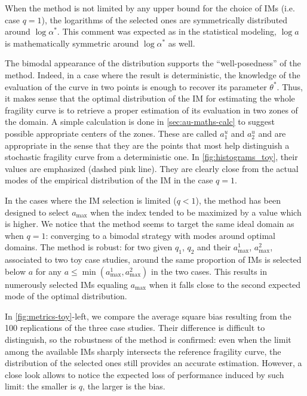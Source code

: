     
    When the method is not limited by any upper bound for the choice of IMs (i.e. case $q=1$), 
    the logarithms of the selected ones are symmetrically distributed around $\log\alpha^\ast$. This comment was expected as in the statistical modeling, $\log a$ is mathematically symmetric around $\log\alpha^\ast$ as well.
    
    The bimodal appearance of the distribution supports the ``well-posedness'' of the method. Indeed, in a case where the result is deterministic, the knowledge of the evaluation of the curve in two points is enough to recover its parameter $\theta^\ast$. Thus, it makes sense that the optimal distribution of the IM for estimating the whole fragility curve is to retrieve a proper estimation of its evaluation in two zones of the domain.
    A simple calculation is done in \cref{sec:au-maths-calc} to suggest possible appropriate centers of the zones. 
    {These are called $a^u_1$ and $a^u_2$ and are appropriate in the sense that they are the points that most help distinguish a stochastic fragility curve from a deterministic one.}
    In  \cref{fig:histograms_toy}, their values are emphasized (dashed pink line). They are clearly close from the actual modes of the empirical distribution of the IM in the case $q=1$.
    
    
    In the cases where the IM selection is limited ($q<1$), the method has been designed to select $a_{\text{max}}$ when the index tended to be maximized by a value which is higher.
    We notice that the method seems to target the same ideal domain as when $q=1$: converging to a bimodal strategy with modes around optimal domains. The method is robust: for two given $q_1$, $q_2$ and their $a_{\text{max}}^1$, $a_{\text{max}}^2$, associated to two toy case studies, around the same proportion of IMs is selected below $a$ for any $a\leq\min(a_{\text{max}}^1, a_{\text{max}}^2)$ in the two cases.
    This results in numerously selected IMs equaling $a_{\text{max}}$ when it falls close to the second expected mode of the optimal distribution.
    
    In  \cref{fig:metrics-toy}-left, we compare the average square bias
    resulting from the 100 replications of the three case studies.
    Their difference is difficult to distinguish, so the robustness of the method is confirmed: even when the limit among the available IMs sharply intersects  the reference fragility curve, the distribution of the selected ones still provides an accurate estimation.
    However, a close look allows to notice the expected loss of performance induced by such limit: the smaller is $q$, the larger is the bias.
    
